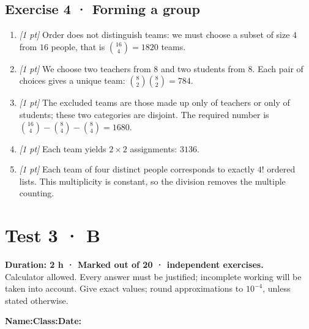 \subsection*{Exercise 4 · Forming a group}\begin{enumerate}

\item \textit{[1 pt]} Order does not distinguish teams: we must choose a subset of size $4$ from $16$ people, that is $\binom{16}4=1820$ teams.

\item \textit{[1 pt]} We choose two teachers from $8$ and two students from $8$. Each pair of choices gives a unique team: $\binom{8}2\binom{8}2=784$.

\item \textit{[1 pt]} The excluded teams are those made up only of teachers or only of students; these two categories are disjoint. The required number is $\binom{16}4-\binom{8}4-\binom{8}4=1680$.

\item \textit{[1 pt]} Each team yields $2\times2$ assignments: $3136$.

\item \textit{[1 pt]} Each team of four distinct people corresponds to exactly $4!$ ordered lists. This multiplicity is constant, so the division removes the multiple counting.

\end{enumerate}

\fi

\fi

\ifmxteacher

\mxnewpage{}\label{sujet:4-4}

\section*{Test 3 · B}


\textbf{Duration: 2 h · Marked out of 20 ·  independent exercises.}\\Calculator allowed. Every answer must be justified; incomplete working will be taken into account. Give exact values; round approximations to $10^{-4}$, unless stated otherwise.

\smallskip\textbf{Name:}\enspace\dotfill\quad\textbf{Class:}\enspace\dotfill\quad\textbf{Date:}\enspace\dotfill

